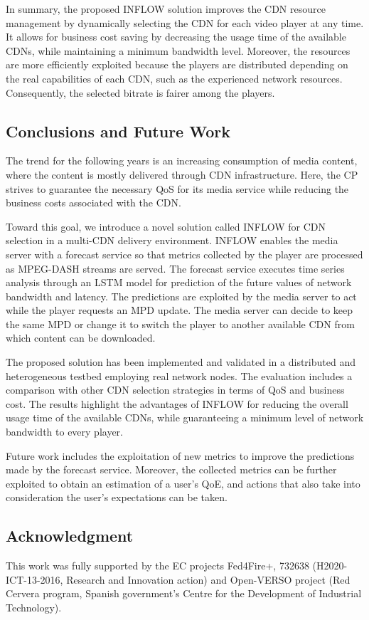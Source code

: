 In summary, the proposed INFLOW solution improves the CDN resource management by dynamically selecting the CDN for each video player at any time. It allows for business cost saving by decreasing the usage time of the available CDNs, while maintaining a minimum bandwidth level. Moreover, the resources are more efficiently exploited because the players are distributed depending on the real capabilities of each CDN, such as the experienced network resources. Consequently, the selected bitrate is fairer among the players.


\subsection{Conclusions and Future Work}
\label{sec:conclusion}
The trend for the following years is an increasing consumption of media content, where the content is mostly delivered through CDN infrastructure. Here, the CP strives to guarantee the necessary QoS for its media service while reducing the business costs associated with the CDN.

Toward this goal, we introduce a novel solution called INFLOW for CDN selection in a multi-CDN delivery environment. INFLOW enables the media server with a forecast service so that metrics collected by the player are processed as MPEG-DASH streams are served. The forecast service executes time series analysis through an LSTM model for prediction of the future values of network bandwidth and latency. The predictions are exploited by the media server to act while the player requests an MPD update. The media server can decide to keep the same MPD or change it to switch the player to another available CDN from which content can be downloaded.

The proposed solution has been implemented and validated in a distributed and heterogeneous testbed employing real network nodes. The evaluation includes a comparison with other CDN selection strategies in terms of QoS and business cost. The results highlight the advantages of INFLOW for reducing the overall usage time of the available CDNs, while guaranteeing a minimum level of network bandwidth to every player.

Future work includes the exploitation of new metrics to improve the predictions made by the forecast service. Moreover, the collected metrics can be further exploited to obtain an estimation of a user's QoE, and actions that also take into consideration the user's expectations can be taken.


\subsection*{Acknowledgment}
\label{sec:ackIEEEA}
This work was fully supported by the EC projects Fed4Fire+, 732638 (H2020-ICT-13-2016, Research and Innovation action) and Open-VERSO project (Red Cervera program, Spanish government's Centre for the Development of Industrial Technology).

